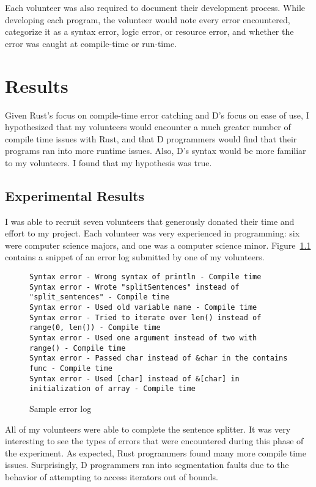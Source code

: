 \documentclass[finalcopy]{srpaper}
\begin{document}
Each volunteer was also required to document their development process. While
developing each program, the volunteer would note every error encountered,
categorize it as a syntax error, logic error, or resource error, and whether
the error was caught at compile-time or run-time.

\chapter{Results}

Given Rust's focus on compile-time error catching and D's focus on ease of
use, I hypothesized that my volunteers would encounter a much greater number
of compile time issues with Rust, and that D programmers would find that their
programs ran into more runtime issues. Also, D's syntax would be more familiar
to my volunteers. I found that my hypothesis was true.

\section{Experimental Results}

I was able to recruit seven volunteers that generously donated their time and
effort to my project. Each volunteer was very experienced in programming: six
were computer science majors, and one was a computer science minor.
Figure~\ref{fig:sampleerrorlog} contains a snippet of an error log submitted
by one of my volunteers.

\begin{figure}[h]
\begin{lstlisting}[breaklines]
Syntax error - Wrong syntax of println - Compile time
Syntax error - Wrote "splitSentences" instead of "split_sentences" - Compile time
Syntax error - Used old variable name - Compile time
Syntax error - Tried to iterate over len() instead of range(0, len()) - Compile time
Syntax error - Used one argument instead of two with range() - Compile time
Syntax error - Passed char instead of &char in the contains func - Compile time
Syntax error - Used [char] instead of &[char] in initialization of array - Compile time
\end{lstlisting}
\caption{Sample error log}
\label{fig:sampleerrorlog}
\end{figure}

All of my volunteers were able to complete the sentence splitter. It was very
interesting to see the types of errors that were encountered during this phase
of the experiment. As expected, Rust programmers found many more compile time
issues. Surprisingly, D programmers ran into segmentation faults due to the
behavior of attempting to access iterators out of bounds.
\end{document}
